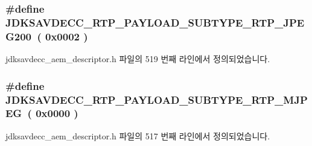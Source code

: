 \subsubsection[{\texorpdfstring{J\+D\+K\+S\+A\+V\+D\+E\+C\+C\+\_\+\+R\+T\+P\+\_\+\+P\+A\+Y\+L\+O\+A\+D\+\_\+\+S\+U\+B\+T\+Y\+P\+E\+\_\+\+R\+T\+P\+\_\+\+J\+P\+E\+G200}{JDKSAVDECC_RTP_PAYLOAD_SUBTYPE_RTP_JPEG200}}]{\setlength{\rightskip}{0pt plus 5cm}\#define J\+D\+K\+S\+A\+V\+D\+E\+C\+C\+\_\+\+R\+T\+P\+\_\+\+P\+A\+Y\+L\+O\+A\+D\+\_\+\+S\+U\+B\+T\+Y\+P\+E\+\_\+\+R\+T\+P\+\_\+\+J\+P\+E\+G200~( 0x0002 )}\hypertarget{group__rtp__payload__subtype_ga173b7a5f5197acd1b7c9b4da5175eefe}{}\label{group__rtp__payload__subtype_ga173b7a5f5197acd1b7c9b4da5175eefe}


jdksavdecc\+\_\+aem\+\_\+descriptor.\+h 파일의 519 번째 라인에서 정의되었습니다.

\subsubsection[{\texorpdfstring{J\+D\+K\+S\+A\+V\+D\+E\+C\+C\+\_\+\+R\+T\+P\+\_\+\+P\+A\+Y\+L\+O\+A\+D\+\_\+\+S\+U\+B\+T\+Y\+P\+E\+\_\+\+R\+T\+P\+\_\+\+M\+J\+P\+EG}{JDKSAVDECC_RTP_PAYLOAD_SUBTYPE_RTP_MJPEG}}]{\setlength{\rightskip}{0pt plus 5cm}\#define J\+D\+K\+S\+A\+V\+D\+E\+C\+C\+\_\+\+R\+T\+P\+\_\+\+P\+A\+Y\+L\+O\+A\+D\+\_\+\+S\+U\+B\+T\+Y\+P\+E\+\_\+\+R\+T\+P\+\_\+\+M\+J\+P\+EG~( 0x0000 )}\hypertarget{group__rtp__payload__subtype_ga27119de23e9df56b0a6d42d0873bcf5b}{}\label{group__rtp__payload__subtype_ga27119de23e9df56b0a6d42d0873bcf5b}


jdksavdecc\+\_\+aem\+\_\+descriptor.\+h 파일의 517 번째 라인에서 정의되었습니다.

